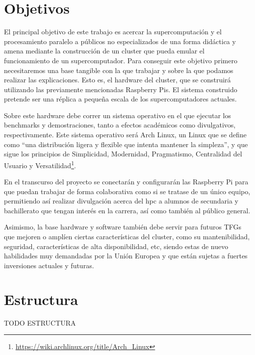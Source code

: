 \section{Objetivos}
\label{sec:objetivos}

El principal objetivo de este trabajo es acercar la supercomputación y el procesamiento paralelo a públicos no especializados de una forma didáctica y amena mediante la construcción de un cluster que pueda emular el funcionamiento de un supercomputador. Para conseguir este objetivo primero necesitaremos una base tangible con la que trabajar y sobre la que podamos realizar las explicaciones. Esto es, el hardware del cluster, que se construirá utilizando las previamente mencionadas Raspberry Pis. El sistema construido pretende ser una réplica a pequeña escala de los supercomputadores actuales.

Sobre este hardware debe correr un sistema operativo en el que ejecutar los benchmarks y demostraciones, tanto a efectos académicos como divulgativos, respectivamente. Este sistema operativo será Arch Linux, un Linux que se define como ``una distribución ligera y flexible que intenta mantener la simpleza'', y que sigue los principios de Simplicidad, Modernidad, Pragmatismo, Centralidad del Usuario y Versatilidad\footnote{\url{https://wiki.archlinux.org/title/Arch\_Linux}}.

En el transcurso del proyecto se conectarán y configurarán las Raspberry Pi para que puedan trabajar de forma colaborativa como si se tratase de un único equipo, permitiendo así realizar divulgación acerca del \acrshort{hpc} a alumnos de secundaria y bachillerato que tengan interés en la carrera, así como también al público general.

Asimismo, la base hardware y software también debe servir para futuros TFGs que mejoren o amplíen ciertas características del cluster, como su mantenibilidad, seguridad, características de alta disponibilidad, etc, siendo estas de nuevo habilidades muy demandadas por la Unión Europea y que están sujetas a fuertes inversiones actuales y futuras.



\section{Estructura}
\label{sec:estructura}

TODO ESTRUCTURA

